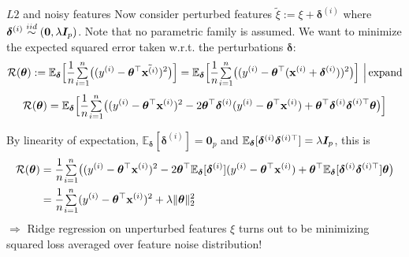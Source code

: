 \documentclass[11pt,compress,t,notes=noshow, xcolor=table]{beamer}
\begin{document}
\begin{vbframe}{$L2$ and noisy features}
Now consider perturbed features $ \tilde{\xi}:= \xi + \bm{\delta}^{(i)}$ where $\bm{\delta}^{(i)} \overset{iid}{\sim} (\bm{0},\lambda \boldsymbol{I}_p)$. Note that no parametric family is assumed. We want to minimize the expected squared error taken w.r.t. the perturbations $\bm{\delta}$:
$$\mathcal{R}(\bm{\theta}):= \mathbb{E}_{\bm{\delta}}\Big[\frac{1}{n}{\textstyle \sum\limits_{i=1}^n}\big((y^{(i)}-\bm{\theta}^{\top}\tilde{\mathbf{x}^{(i)}})^2\big)\Big] = \mathbb{E}_{\bm{\delta}}\Big[\frac{1}{n}{\textstyle \sum\limits_{i=1}^n}\big((y^{(i)}-\bm{\theta}^{\top}(\mathbf{x}^{(i)}+\bm{\delta}^{(i)}))^2\big)\Big]\,\,\Big|\, \text{expand}$$
\vspace{-0.2cm}
$$\mathcal{R}(\bm{\theta}) = \mathbb{E}_{\bm{\delta}}\Big[\frac{1}{n}{\textstyle \sum\limits_{i=1}^n}\big((y^{(i)}-\bm{\theta}^{\top}\mathbf{x}^{(i)})^2 - 2 \bm{\theta}^{\top}\bm{\delta}^{(i)}(y^{(i)}-\bm{\theta}^{\top}\mathbf{x}^{(i)}) + \bm{\theta}^{\top}\bm{\delta}^{(i)}\bm{{\delta}}^{(i) \top}\bm{\theta}\big)\Big]$$

By linearity of expectation, $\mathbb{E}_{\bm{\delta}}[\bm{\delta}^{(i)}]=\bm{0}_p$ and $\mathbb{E}_{\bm{\delta}}[\bm{\delta}^{(i)}\bm{\delta}^{(i)\top}]=\lambda \boldsymbol{I}_p$, this is
\vspace{-0.2cm}
%
\begin{align*}\mathcal{R}(\bm{\theta})&=\frac{1}{n}{\textstyle \sum\limits_{i=1}^n}\big((y^{(i)}-\bm{\theta}^{\top}\mathbf{x}^{(i)})^2 - 2 \bm{\theta}^{\top}\mathbb{E}_{\bm{\delta}}[\bm{\delta}^{(i)}](y^{(i)}-\bm{\theta}^{\top}\mathbf{x}^{(i)}) + \bm{\theta}^{\top}\mathbb{E}_{\bm{\delta}}[\bm{\delta}^{(i)}\bm{\delta}^{(i)\top}]\bm{\theta} \big) \\
&= \frac{1}{n}{\textstyle \sum\limits_{i=1}^n}(y^{(i)}-\bm{\theta}^{\top}\mathbf{x}^{(i)})^2+\lambda \Vert \bm{\theta} \Vert_2^2
\end{align*}
$\Longrightarrow$ Ridge regression on unperturbed features {\small $\xi$} turns out to be minimizing squared loss averaged over feature noise distribution!
\end{vbframe}
\end{document}
